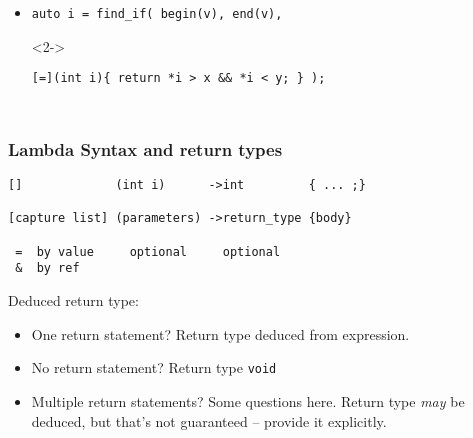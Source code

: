 \begin{frame}[fragile]
\begin{columns}[t]
\vskip 48pt
\begin{itemize}
\item  <2->{\scriptsize\begin{verbatim}auto i = find_if( begin(v), end(v), \end{verbatim}}
\item[]<2->{\scriptsize\begin{verbatim}[=](int i){ return *i > x && *i < y; } );\end{verbatim}}
\end{itemize}

\end{columns}
\end{frame}


\begin{frame}[fragile,t]
\frametitle{Lambda Syntax and return types}

{\scriptsize
\begin{verbatim}
[]             (int i)      ->int         { ... ;}

[capture list] (parameters) ->return_type {body} 

 =  by value     optional     optional
 &  by ref      
\end{verbatim}
}

Deduced return type:
\begin{itemize}
\item One return statement? Return type deduced from expression.
\item No return statement?  Return type \texttt{void}
\item Multiple return statements? Some questions here. Return type \emph{may} be deduced,
  but that's not guaranteed -- provide it explicitly.
\end{itemize}
\end{frame}

